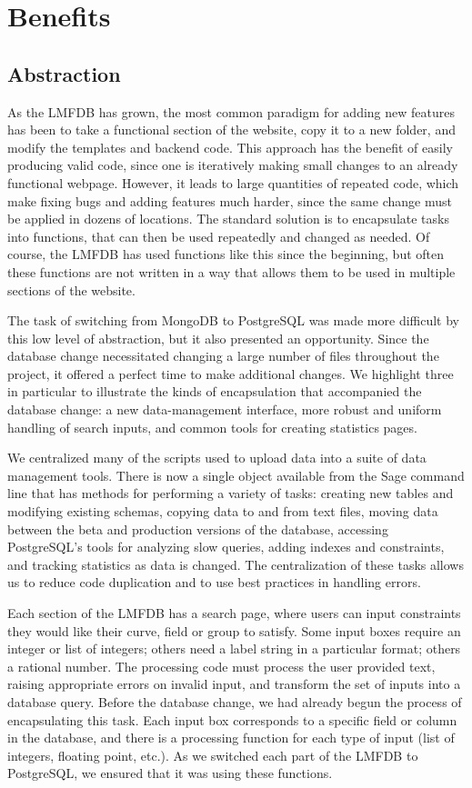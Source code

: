\documentclass{amsart}
\begin{document}
\section{Benefits}

\subsection{Abstraction}

As the LMFDB has grown, the most common paradigm for adding new features has been to take a functional section of the website, copy it to a new folder, and modify the templates and backend code.
This approach has the benefit of easily producing valid code, since one is iteratively making small changes to an already functional webpage.
However, it leads to large quantities of repeated code, which make fixing bugs and adding features much harder, since the same change must be applied in dozens of locations.
The standard solution is to encapsulate tasks into functions, that can then be used repeatedly and changed as needed.
Of course, the LMFDB has used functions like this since the beginning, but often these functions are not written in a way that allows them to be used in multiple sections of the website.

The task of switching from MongoDB to PostgreSQL was made more difficult by this low level of abstraction, but it also presented an opportunity.
Since the database change necessitated changing a large number of files throughout the project, it offered a perfect time to make additional changes.
We highlight three in particular to illustrate the kinds of encapsulation that accompanied the database change: a new data-management interface, more robust and uniform handling of search inputs, and common tools for creating statistics pages.

We centralized many of the scripts used to upload data into a suite of data management tools.
There is now a single object available from the Sage command line that has methods for performing a variety of tasks: creating new tables and modifying existing schemas, copying data to and from text files, moving data between the beta and production versions of the database, accessing PostgreSQL's tools for analyzing slow queries, adding indexes and constraints, and tracking statistics as data is changed.
The centralization of these tasks allows us to reduce code duplication and to use best practices in handling errors.

Each section of the LMFDB has a search page, where users can input constraints they would like their curve, field or group to satisfy.
Some input boxes require an integer or list of integers; others need a label string in a particular format; others a rational number.
The processing code must process the user provided text, raising appropriate errors on invalid input, and transform the set of inputs into a database query.
Before the database change, we had already begun the process of encapsulating this task.
Each input box corresponds to a specific field or column in the database, and there is a processing function for each type of input (list of integers, floating point, etc.).
As we switched each part of the LMFDB to PostgreSQL, we ensured that it was using these functions.
\end{document}
